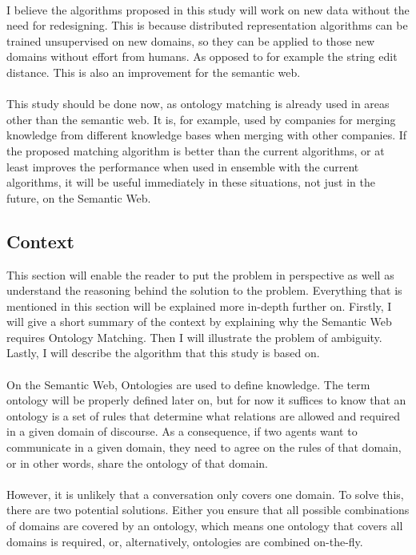 \documentclass{article}
\begin{document}
 \paragraph{}
 I believe the algorithms proposed in this study will work on new data without the need for redesigning. This is because distributed representation algorithms can be trained unsupervised on new domains, so they can be applied to those new domains without effort from humans. As opposed to for example the string edit distance. This is also an improvement for the semantic web.
 \paragraph{}
 This study should be done now, as ontology matching is already used in areas other than the semantic web. It is, for example, used by companies for merging knowledge from different knowledge bases when merging with other companies. If the proposed matching algorithm is better than the current algorithms, or at least improves the performance when used in ensemble with the current algorithms, it will be useful immediately in these situations, not just in the future, on the Semantic Web.

 \subsection{Context}
 This section will enable the reader to put the problem in perspective as well as understand the reasoning behind the solution to the problem. Everything that is mentioned in this section will be explained more in-depth further on.
 Firstly, I will give a short summary of the context by explaining why the Semantic Web requires Ontology Matching. Then I will illustrate the problem of ambiguity. Lastly, I will describe the algorithm that this study is based on.
 \paragraph{}
 On the Semantic Web, Ontologies are used to define knowledge\cite{fensel2001ontologies}.
 The term ontology will be properly defined later on, but for now it suffices to know that an ontology is a set of rules that determine what relations are allowed and required in a given domain of discourse. As a consequence, if two agents want to communicate in a given domain, they need to agree on the rules of that domain, or in other words, share the ontology of that domain.
 \paragraph{}
 However, it is unlikely that a conversation only covers one domain. To solve this, there are two potential solutions. Either you ensure that all possible combinations of domains are covered by an ontology, which means one ontology that covers all domains is required, or, alternatively, ontologies are combined on-the-fly.
\end{document}
